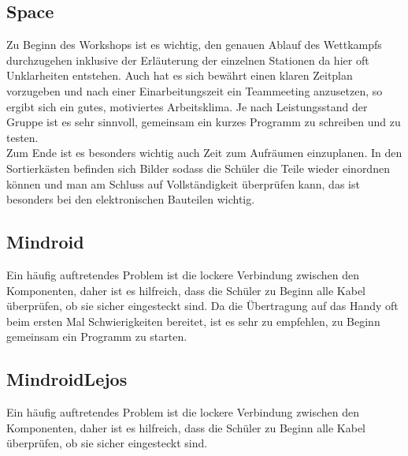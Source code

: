 \documentclass[
	ngerman,
	IMRAD=false,
	DIV=calc,
	paper=a4,
	marginpar=false,
	accentcolor=1c,%
	]{tudapub}
\begin{document}
\subsection{Space}
Zu Beginn des Workshops ist es wichtig, den genauen Ablauf des Wettkampfs durchzugehen inklusive der Erl\"auterung der einzelnen Stationen da hier oft Unklarheiten entstehen.\newline
Auch hat es sich bew\"ahrt einen klaren Zeitplan vorzugeben und nach einer Einarbeitungszeit ein Teammeeting anzusetzen, so ergibt sich ein gutes, motiviertes Arbeitsklima.\newline
Je nach Leistungsstand der Gruppe ist es sehr sinnvoll, gemeinsam ein kurzes Programm zu schreiben und zu testen.
\\Zum Ende ist es besonders wichtig auch Zeit zum Aufr\"aumen einzuplanen. In den Sortierk\"asten befinden sich Bilder sodass die Sch\"uler die Teile wieder einordnen k\"onnen und man am Schluss auf Vollst\"andigkeit \"uberpr\"ufen kann, das ist besonders bei den elektronischen Bauteilen wichtig.

\subsection{Mindroid}
Ein h\"aufig auftretendes Problem ist die lockere Verbindung zwischen den Komponenten, daher ist es hilfreich, dass die Sch\"uler zu Beginn alle Kabel \"uberpr\"ufen, ob sie sicher eingesteckt sind.\newline
Da die \"Ubertragung auf das Handy oft beim ersten Mal Schwierigkeiten bereitet, ist es sehr zu empfehlen, zu Beginn gemeinsam ein Programm zu starten.\\


\subsection{MindroidLejos}
Ein h\"aufig auftretendes Problem ist die lockere Verbindung zwischen den Komponenten, daher ist es hilfreich, dass die Sch\"uler zu Beginn alle Kabel \"uberpr\"ufen, ob sie sicher eingesteckt sind.\newline




\cfoot{\textcolor{lightgray} \today}
\end{document}
